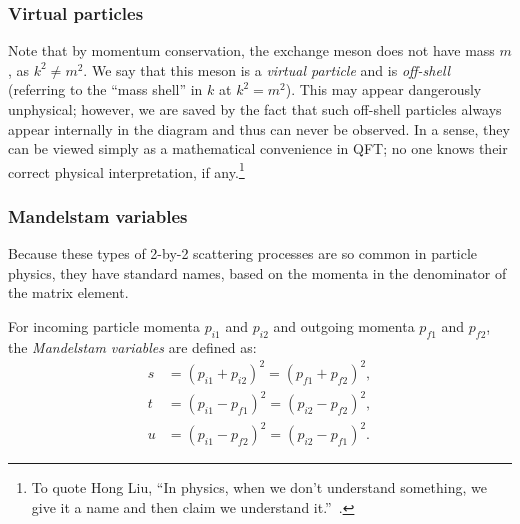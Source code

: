 \subsubsection{Virtual particles}

Note that by momentum conservation, the exchange meson does not have mass $m$, as $k^2 \neq m^2$.
We say that this meson is a \textit{virtual particle} and is \textit{off-shell} (referring to the ``mass shell'' in $k$ at $k^2 = m^2$).
This may appear dangerously unphysical; however, we are saved by the fact that such off-shell particles always appear internally in the diagram and thus can never be observed.
In a sense, they can be viewed simply as a mathematical convenience in QFT; no one knows their correct physical interpretation, if any.\footnote{To quote Hong Liu, ``In physics, when we don't understand something, we give it a name and then claim we understand it.''~\cite{LiuRQFT}.}


\subsubsection{Mandelstam variables}

Because these types of 2-by-2 scattering processes are so common in particle physics, they have standard names, based on the momenta in the denominator of the matrix element.

\begin{definition}
	For incoming particle momenta $p_{i1}$ and $p_{i2}$ and outgoing momenta $p_{f1}$ and $p_{f2}$, the \textit{Mandelstam variables} are defined as:
	\begin{equation}
		\label{eq:01_qft_interactions_mandelstam}
		\begin{split}
			s &= (p_{i1} + p_{i2})^2 = (p_{f1} + p_{f2})^2, \\
			t &= (p_{i1} - p_{f1})^2 = (p_{i2} - p_{f2})^2, \\
			u &= (p_{i1} - p_{f2})^2 = (p_{i2} - p_{f1})^2.
		\end{split}
	\end{equation}
\end{definition}

